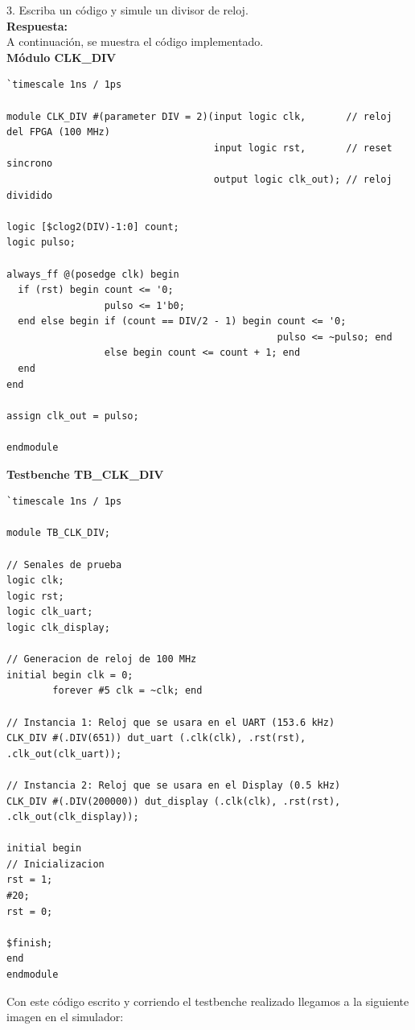 \documentclass[letterpaper, 12pt]{article}
\begin{document}
3. Escriba un código y simule un divisor de reloj.\\

\textbf{Respuesta:}\\

A continuación, se muestra el código implementado.\\

\textbf{Módulo CLK\_DIV}

\begin{lstlisting}
`timescale 1ns / 1ps

module CLK_DIV #(parameter DIV = 2)(input logic clk,       // reloj del FPGA (100 MHz)
                                    input logic rst,       // reset sincrono
                                    output logic clk_out); // reloj dividido

logic [$clog2(DIV)-1:0] count;
logic pulso;

always_ff @(posedge clk) begin
  if (rst) begin count <= '0;
                 pulso <= 1'b0;
  end else begin if (count == DIV/2 - 1) begin count <= '0;
                                               pulso <= ~pulso; end
                 else begin count <= count + 1; end
  end
end
  
assign clk_out = pulso;

endmodule
\end{lstlisting}

\textbf{Testbenche TB\_CLK\_DIV}

\begin{lstlisting}
`timescale 1ns / 1ps

module TB_CLK_DIV;

// Senales de prueba
logic clk;
logic rst;
logic clk_uart;
logic clk_display;

// Generacion de reloj de 100 MHz
initial begin clk = 0;
        forever #5 clk = ~clk; end

// Instancia 1: Reloj que se usara en el UART (153.6 kHz)
CLK_DIV #(.DIV(651)) dut_uart (.clk(clk), .rst(rst), .clk_out(clk_uart));

// Instancia 2: Reloj que se usara en el Display (0.5 kHz)
CLK_DIV #(.DIV(200000)) dut_display (.clk(clk), .rst(rst), .clk_out(clk_display));

initial begin
// Inicializacion
rst = 1; 
#20; 
rst = 0;

$finish;
end
endmodule
\end{lstlisting}

Con este código escrito y corriendo el testbenche realizado llegamos a la siguiente imagen en el simulador:
\end{document}
